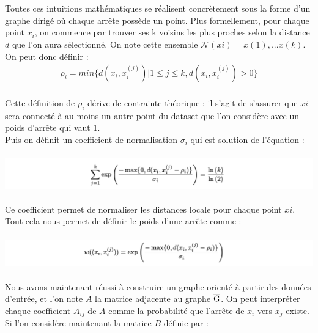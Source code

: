         \\
        \\
        Toutes ces intuitions mathématiques se réalisent concrètement sous la forme d’un graphe dirigé où chaque arrête possède un point. Plus formellement, pour chaque point $x_i$, on commence par trouver ses k voisins les plus proches selon la distance $d$ que l’on aura sélectionné. On note cette ensemble $\mathcal{N} (xi) = {x(1), . . . x(k)}$. On peut donc définir :
        \\
        \begin{eqnarray}
            \rho_i = min\{d(x_i, x_i^{(j)})|1 \leqslant j \leqslant k, d(x_i, x_i^{(j)}) > 0 \}
        \end{eqnarray}
        \\
        Cette définition de $\rho_i$ dérive de contrainte théorique : il s’agit de s’assurer que $xi$ sera connecté à au moins un autre point du dataset que l’on considère avec un poids d’arrête qui vaut 1.
        \\
        Puis on définit un coefficient de normalisation $\sigma_i$ qui est solution de l’équation :
        \\
        \\
        \includegraphics[width=\linewidth]{./img/umap/eq_1}
        \\
        \\
        Ce coefficient permet de normaliser les distances locale pour chaque point $xi$. Tout cela nous permet de définir le poids d’une arrête comme :   
        \\
        \\
        \includegraphics[width=\linewidth]{./img/umap/eq_2}
        \\
        \\
        Nous avons maintenant réussi à construire un graphe orienté à partir des données d’entrée, et l’on note $A$ la matrice adjacente au graphe $\overline{\rm G}$. On peut interpréter chaque coefficient $A_{ij}$ de $A$ comme la probabilité que l’arrête de $x_i$ vers $x_j$ existe.
        Si l’on considère maintenant la matrice $B$ définie par :
        \\
